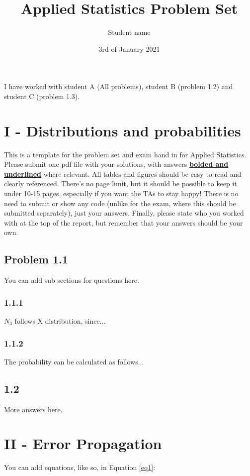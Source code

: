 \documentclass{article}
\title{Applied Statistics Problem Set}
\author{Student name}
\date{3rd of January 2021}
\begin{document}
\maketitle

I have worked with student A (All problems), student B (problem 1.2) and student C (problem 1.3).


\section*{I - Distributions and probabilities}

This is a template for the problem set and exam hand in for Applied Statistics. Please submit one pdf file with your solutions, with answers \textbf{\underline{bolded and underlined}} where relevant.
%
All tables and figures should be easy to read and clearly referenced. There's no page limit, but it should be possible to keep it under 10-15 pages, especially if you want the TAs to stay happy!
%
There is no need to submit or show any code (unlike for the exam, where this should be submitted separately), just your answers. Finally, please state who you worked with at the top of the report, but remember that your answers should be your own.


\subsection*{Problem 1.1} You can add sub sections for questions here. 

\subsubsection*{1.1.1} $N_3$ follows X distribution, since...

\subsubsection*{1.1.2} The probability can be calculated as follows...


\subsection*{1.2}
More answers here. 



\section*{II - Error Propagation}
You can add equations, like so, in Equation \ref{eq1}: 
\end{document}
